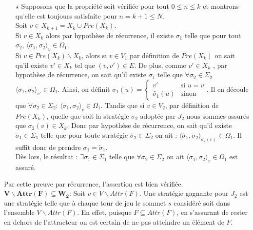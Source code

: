 \begin{demonstration}
\begin{enumerate}
			\item[$\star$] Supposons que la propriété soit vérifiée pour tout $ 0 \leq n \leq k $ et montrons qu'elle est toujours satisfaite pour $n = k + 1 \leq N$. \\
			Soit $v \in X_{k+1} = X_{k} \cup Pre(X_{k})$. \\
			Si $v \in X_{k}$ alors par hypothèse de récurrence, il existe $\sigma _{1}$ telle que pour tout $\sigma_2$, $ \langle \sigma _{1},\sigma _{2} \rangle_v \in \Omega _{1}$.\\
			Si $v \in Pre(X_{k})\backslash X_k$, alors si $v \in V_{1}$ par définition de $Pre(X_{k})$ on sait qu'il existe $v'\in X_{k}$ tel que $(v,v')\in E$. De plus, comme $v' \in X_k$ , par hypothèse de récurrence, on sait qu'il existe $\tilde{\sigma}_1$ telle que $\forall \sigma_2 \in \Sigma_2$ $\langle \sigma_1, \sigma_2 \rangle_{v'} \in \Omega_1$. Ainsi, on définit $\sigma _{1}(u) =\begin{cases} v' & \text{si } u = v \\ \tilde{\sigma_1}(u) & \text{sinon} \end{cases}$. Il en découle que $\forall \sigma_2 \in \Sigma_2$: $\langle \sigma_1, \sigma_2 \rangle_v \in \Omega_1$.
			 Tandis que si $v \in V_{2}$, par définition de $Pre(X_k)$, quelle que soit la stratégie $\sigma _{2}$ adoptée par $J_{2}$  nous sommes assurés que $\sigma _{2}(v) \in X_{k}$. Donc par hypothèse de récurrence, on sait qu'il existe $\tilde{\sigma}_1 \in \Sigma_1$ telle que pour toute stratégie $\tilde{\sigma_2} \in \Sigma_2$ on ait : $\langle \tilde{\sigma}_1, \tilde{\sigma}_2 \rangle_{\sigma_2(v)} \in \Omega_1$. Il suffit donc de prendre $\sigma_1  = \tilde{\sigma}_1$.\\
			
			 Dès lors, le résultat : $\exists \sigma_1 \in \Sigma_1$ telle que $\forall \sigma_2 \in \Sigma_2$ on ait $ \langle \sigma _{1},\sigma _{2} \rangle_v \in \Omega _{1}$ est assuré.
		\end{enumerate}
		Par cette preuve par récurrence, l'assertion est bien vérifiée.\\
		
		\noindent$\mathbf{V \backslash Attr(F) \subseteq W_{2}}$: Soit $v \in V \backslash Attr(F)$. Une stratégie gagnante pour $J_{2}$ est une stratégie telle que à chaque tour de jeu le sommet $s$ considéré soit dans l'ensemble $V\backslash Attr(F)$. En effet, puisque $F \subseteq Attr(F)$, en s'assurant de rester en dehors de l'attracteur on est certain de ne pas atteindre un élément de $F$.\\
		

\end{demonstration}
